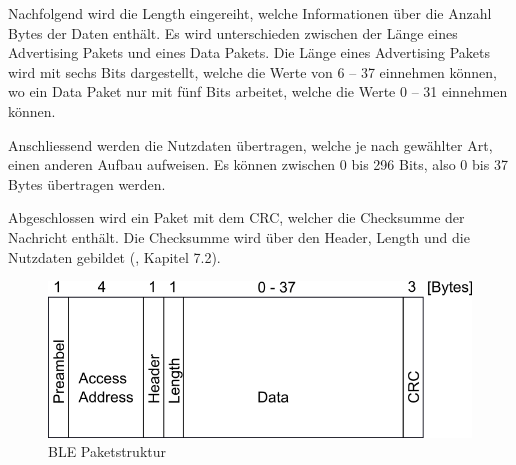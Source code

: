Nachfolgend wird die Length eingereiht, welche Informationen über die Anzahl Bytes der Daten enthält. Es wird unterschieden zwischen der Länge eines Advertising Pakets und eines Data Pakets. Die Länge eines Advertising Pakets wird mit sechs Bits dargestellt, welche die Werte von 6 – 37 einnehmen können, wo ein Data Paket nur mit fünf Bits arbeitet, welche die Werte 0 – 31 einnehmen können.

Anschliessend werden die Nutzdaten übertragen, welche je nach gewählter Art, einen anderen Aufbau aufweisen. Es können zwischen 0 bis 296 Bits, also 0 bis 37 Bytes übertragen werden. 

Abgeschlossen wird ein Paket mit dem CRC, welcher die Checksumme der Nachricht enthält. Die Checksumme wird über den Header, Length und die Nutzdaten gebildet (\cite{BLE_Book}, Kapitel 7.2).


\begin{figure}[ht]
    \includegraphics[width=1.0\textwidth]{2TheoretischeGrundlagen/imag/BLE_Paketstruktur.png}
    \caption{BLE Paketstruktur}
    \label{ble_paket} 
\end{figure}



